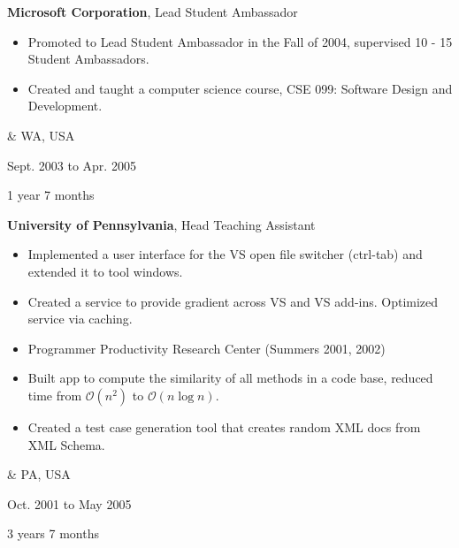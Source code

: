 \documentclass[10pt, letterpaper]{article}
\newenvironment{highlights}{
        \begin{itemize}[
                topsep=0pt,
                parsep=0.10 cm,
                partopsep=0pt,
                itemsep=0pt,
                after=\vspace{-1\baselineskip},
                leftmargin=0.4 cm + 3pt
            ]
    }{
        \end{itemize}
    } %
\let\originalTabularx\tabularx
\let\originalEndTabularx\endtabularx
\renewenvironment{tabularx}{\bgroup\centering\originalTabularx}{\originalEndTabularx\par\egroup}
\begin{document}
        \vspace{0.2 cm}
        \begin{tabularx}{
            \textwidth-0.4 cm-0.13cm
        }{
            K{0.2 cm}
            R{4.1 cm}
        }
            \textbf{Microsoft Corporation}, Lead Student Ambassador

            \vspace{0.10 cm}

            \begin{highlights}
                \item Promoted to Lead Student Ambassador in the Fall of 2004, supervised 10 - 15 Student Ambassadors.
                \item Created and taught a computer science course, CSE 099: Software Design and Development.
            \end{highlights}
            &
            WA, USA

            Sept. 2003 to Apr. 2005

            1 year 7 months
        \end{tabularx}

        \vspace{0.2 cm}
        \begin{tabularx}{
            \textwidth-0.4 cm-0.13cm
        }{
            K{0.2 cm}
            R{4.1 cm}
        }
            \textbf{University of Pennsylvania}, Head Teaching Assistant

            \vspace{0.10 cm}

            \begin{highlights}
                \item Implemented a user interface for the VS open file switcher (ctrl-tab) and extended it to tool windows.
                \item Created a service to provide gradient across VS and VS add-ins. Optimized service via caching.
                \item Programmer Productivity Research Center (Summers 2001, 2002)
                \item Built app to compute the similarity of all methods in a code base, reduced time from $\mathcal{O}(n^2)$ to $\mathcal{O}(n \log n)$. 
                \item Created a test case generation tool that creates random XML docs from XML Schema.
            \end{highlights}
            &
            PA, USA

            Oct. 2001 to May 2005

            3 years 7 months
        \end{tabularx}
\end{document}
